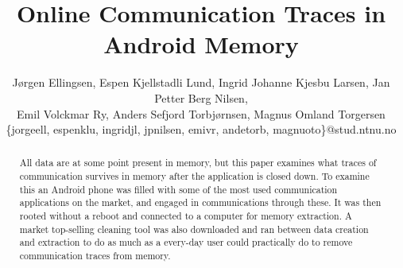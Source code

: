 \documentclass{sig-alternate-05-2015}
\begin{document}
\title{Online Communication Traces in Android Memory}

\author{
J{\o}rgen Ellingsen, Espen Kjellstadli Lund, Ingrid Johanne Kjesbu Larsen, Jan Petter Berg Nilsen,\\
Emil Volckmar Ry, Anders Sefjord Torbj{\o}rnsen, Magnus Omland Torgersen
\\\{jorgeell, espenklu, ingridjl, jpnilsen, emivr, andetorb, magnuoto\}@stud.ntnu.no
}

\maketitle
\begin{abstract}
All data are at some point present in memory, but this paper examines what traces of communication survives in memory after the application is closed down. To examine this an Android phone was filled with some of the most used communication applications on the market, and engaged in communications through these. It was then rooted without a reboot and connected to a computer for memory extraction. A market top-selling cleaning tool was also downloaded and ran between data creation and extraction to do as much as a every-day user could practically do to remove communication traces from memory.
\end{abstract}
















  
\end{document}
